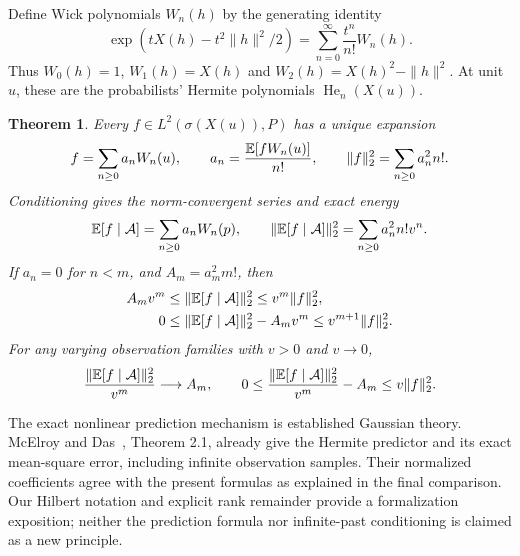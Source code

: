 \documentclass[11pt]{article}
\newtheorem{theorem}{Theorem}[section]
\begin{document}
Define Wick polynomials $W_n(h)$ by the generating identity
\begin{equation}\label{eq:gen}
 \exp(tX(h)-t^2\|h\|^2/2)
 =\sum_{n=0}^\infty\frac{t^n}{n!}W_n(h).
\end{equation}
Thus $W_0(h)=1$, $W_1(h)=X(h)$ and $W_2(h)=X(h)^2-\|h\|^2$.
At unit $u$, these are the probabilists' Hermite polynomials
$\operatorname{He}_n(X(u))$.

\begin{theorem}\label{thm:energy}
Every $f\in L^2(\sigma(X(u)),P)$ has a unique expansion
\begin{equation}\label{eq:terminal}
 f=\sum_{n\geq0}a_n W_n(u),\qquad
 a_n=\frac{\mathbb E[fW_n(u)]}{n!},\qquad
 \|f\|_2^2=\sum_{n\geq0}a_n^2n!.
\end{equation}
Conditioning gives the norm-convergent series and exact energy
\begin{equation}\label{eq:prediction}
 \mathbb E[f\mid\mathcal A]=\sum_{n\geq0}a_n W_n(p),\qquad
 \|\mathbb E[f\mid\mathcal A]\|_2^2=\sum_{n\geq0}a_n^2n!v^n.
\end{equation}
If $a_n=0$ for $n<m$, and $A_m=a_m^2m!$, then
\begin{align}
 A_m v^m&\leq\|\mathbb E[f\mid\mathcal A]\|_2^2
                    \leq v^m\|f\|_2^2,\label{eq:rankbounds}\\
 0&\leq\|\mathbb E[f\mid\mathcal A]\|_2^2-A_mv^m
                    \leq v^{m+1}\|f\|_2^2.\label{eq:remainder}
\end{align}
For any varying observation families with $v>0$ and $v\to0$,
\begin{equation}\label{eq:ranklimit}
 \frac{\|\mathbb E[f\mid\mathcal A]\|_2^2}{v^m}\longrightarrow A_m,
 \qquad
 0\leq\frac{\|\mathbb E[f\mid\mathcal A]\|_2^2}{v^m}-A_m
       \leq v\|f\|_2^2.
\end{equation}
\end{theorem}

The exact nonlinear prediction mechanism is established Gaussian
theory. McElroy and Das~\cite{MD}, Theorem 2.1, already give the
Hermite predictor and its exact mean-square error, including infinite
observation samples. Their normalized coefficients agree with the
present formulas as explained in the final comparison. Our Hilbert
notation and explicit rank remainder provide a formalization
exposition; neither the prediction formula nor infinite-past
conditioning is claimed as a new principle.
\end{document}
